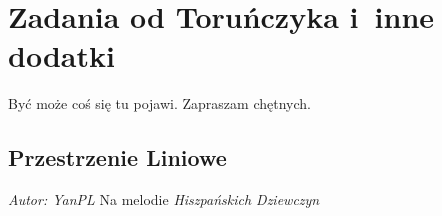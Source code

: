 \documentclass[11pt]{mwrep}
\renewcommand{\[}{\begin{equation}}
\renewcommand{\]}{\end{equation}}
\begin{document}
\chapter{Zadania od Toruńczyka i~inne dodatki}
Być może coś się tu pojawi. Zapraszam chętnych. \\
\setlength{\unitlength}{4cm}

\newpage
\section*{Przestrzenie Liniowe}
\textit{Autor: YanPL} Na melodie \textit{Hiszpańskich Dziewczyn}  \par\nopagebreak
\end{document}
